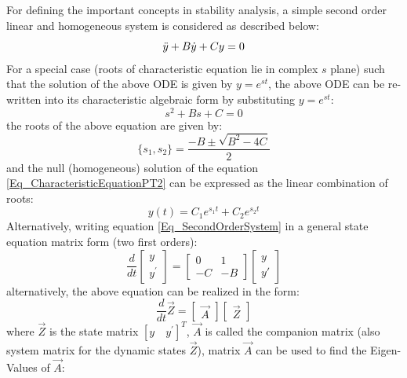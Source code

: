 For defining the important concepts in stability analysis, a simple second order linear and homogeneous system is considered as described below:
\begin{equation} \label{Eq_SecondOrderSystem}
\Ddot{y} + B \Dot{y} + C y = 0
\end{equation}
For a special case (roots of characteristic equation lie in complex $s$ plane) such that the solution of the above ODE is given by $y = e^{st}$, the above ODE can be re-written into its characteristic algebraic form by substituting $y = e^{st}$:
\begin{equation} \label{Eq_CharacteristicEquationPT2}
s^2 + B s + C = 0
\end{equation}
the roots of the above equation are given by:
\begin{equation}
\{s_1,s_2\} = \frac{-B \pm \sqrt{B^2 - 4 C}}{2}
\end{equation}
and the null (homogeneous) solution of the equation \eqref{Eq_CharacteristicEquationPT2} can be expressed as the linear combination of roots:
\begin{equation} \label{Eq_GS_Char_PT2}
y(t) = C_1 e^{s_{1}t} + C_2 e^{s_{2}t}
\end{equation}
Alternatively, writing equation \eqref{Eq_SecondOrderSystem} in a general state equation matrix form (two first orders):
\begin{equation}
\frac{d}{dt} \begin{bmatrix}
	y \\ y^{\prime}
\end{bmatrix} = \begin{bmatrix}0 & 1 \\
-C & -B\end{bmatrix} \begin{bmatrix}y \\ y'\end{bmatrix}
\end{equation}
alternatively, the above equation can be realized in the form:
\begin{equation}
\frac{d}{dt}\vec{Z} = \begin{bmatrix} \vec{A} \end{bmatrix} \begin{bmatrix} \vec{Z} \end{bmatrix}
\end{equation}
where $\vec{Z}$ is the state matrix $[y \quad y^{\prime}]^{T}$, $\vec{A}$ is called the companion matrix (also system matrix for the dynamic states $\vec{Z}$), matrix $\vec{A}$ can be used to find the Eigen-Values of $\vec{A}$:
